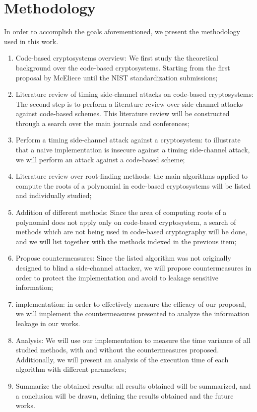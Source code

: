 \section{Methodology}
In order to accomplish the goals aforementioned, we present the methodology used in this work.
\begin{enumerate}
    \item Code-based cryptosystems overview: We first study the theoretical background over the code-based cryptosystems. Starting from the first proposal by McEliece until the NIST standardization submissions;
    \item Literature review of timing side-channel attacks on code-based cryptosystems: The second step is to perform a literature review over side-channel attacks against code-based schemes. This literature review will be constructed through a search over the main journals and conferences;
    \item Perform a timing side-channel attack against a cryptosystem: to illustrate that a naive implementation is insecure against a timing side-channel attack, we will perform an attack against a code-based scheme;
    \item Literature review over root-finding methods: the main algorithms applied to compute the roots of a polynomial in code-based cryptosystems will be listed and individually studied; 
    \item Addition of different methods: Since the area of computing roots of a polynomial does not apply only on code-based cryptosystem, a search of methods which are not being used in code-based cryptography will be done, and we will list together with the methods indexed in the previous item;
    \item Propose countermeasures: Since the listed algorithm was not originally designed to blind a side-channel attacker, we will propose countermeasures in order to protect the implementation and avoid to leakage sensitive information;
    \item implementation: in order to effectively measure the efficacy of our proposal, we will implement the countermeasures presented to analyze the information leakage in our works.
    \item Analysis: We will use our implementation to measure the time variance of all studied methods, with and without the countermeasures proposed. Additionally, we will present an analysis of the execution time of each algorithm with different parameters;
    \item Summarize the obtained results: all results obtained will be summarized, and a conclusion will be drawn, defining the results obtained and the future works.
\end{enumerate}

